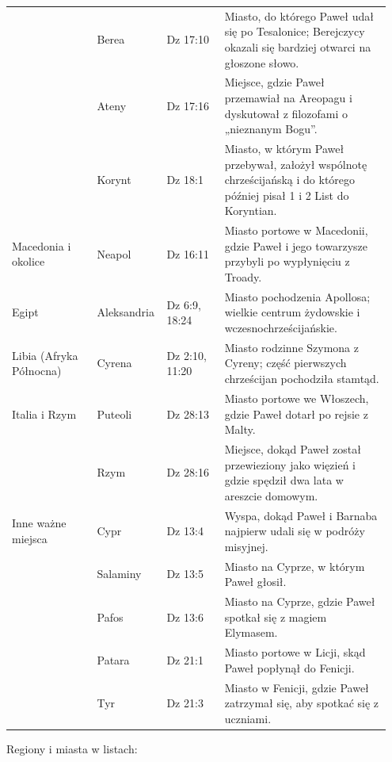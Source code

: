 \begin{longtable}[]{@{}p{0.22\linewidth} p{0.15\linewidth} p{0.15\linewidth} p{0.43\linewidth}@{}}
 & Berea & Dz 17:10 & Miasto, do którego Paweł udał się po Tesalonice; Berejczycy okazali się bardziej otwarci na głoszone słowo. \\
 & Ateny & Dz 17:16 & Miejsce, gdzie Paweł przemawiał na Areopagu i dyskutował z filozofami o „nieznanym Bogu”. \\
 & Korynt & Dz 18:1 & Miasto, w którym Paweł przebywał, założył wspólnotę chrześcijańską i do którego później pisał 1 i 2 List do Koryntian. \\
\midrule
Macedonia i okolice & Neapol & Dz 16:11 & Miasto portowe w Macedonii, gdzie Paweł i jego towarzysze przybyli po wypłynięciu z Troady. \\
\midrule
Egipt & Aleksandria & Dz 6:9, 18:24 & Miasto pochodzenia Apollosa; wielkie centrum żydowskie i wczesnochrześcijańskie. \\
\midrule
Libia (Afryka Północna) & Cyrena & Dz 2:10, 11:20 & Miasto rodzinne Szymona z Cyreny; część pierwszych chrześcijan pochodziła stamtąd. \\
\midrule
Italia i Rzym & Puteoli & Dz 28:13 & Miasto portowe we Włoszech, gdzie Paweł dotarł po rejsie z Malty. \\
 & Rzym & Dz 28:16 & Miejsce, dokąd Paweł został przewieziony jako więzień i gdzie spędził dwa lata w areszcie domowym. \\
\midrule
Inne ważne miejsca & Cypr & Dz 13:4 & Wyspa, dokąd Paweł i Barnaba najpierw udali się w podróży misyjnej. \\
 & Salaminy & Dz 13:5 & Miasto na Cyprze, w którym Paweł głosił. \\
 & Pafos & Dz 13:6 & Miasto na Cyprze, gdzie Paweł spotkał się z magiem Elymasem. \\
 & Patara & Dz 21:1 & Miasto portowe w Licji, skąd Paweł popłynął do Fenicji. \\
 & Tyr & Dz 21:3 & Miasto w Fenicji, gdzie Paweł zatrzymał się, aby spotkać się z uczniami. \\
\bottomrule
\end{longtable}

Regiony i miasta w listach:

